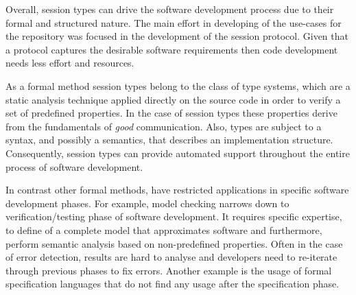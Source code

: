 Overall, session types can drive the software development
process due to their formal and structured nature.
The main effort in developing of the use-cases for the repository
was focused in the development of the session protocol.
Given that a protocol captures the desirable software requirements
then code development needs less effort and resources.
 
As a formal method session types belong to the class of type systems,
which are a static analysis technique applied directly
on the source code in order to verify a set of predefined properties.
In the case of session types these properties derive
from the fundamentals of {\em good} communication.
Also, types are subject to a syntax,
and possibly a semantics, that describes an implementation structure.
Consequently, session types can provide automated support throughout
the entire process of software development. 







In contrast other formal methods, have restricted applications
in specific software development phases.
For example, model checking
narrows down to verification/testing phase of software development.
It requires specific expertise, to define
of a complete model that approximates software and furthermore,
perform semantic analysis based on non-predefined properties.
Often in the case of error detection, results are hard to analyse
and developers need to re-iterate through previous phases
to fix errors.
Another example is the usage of formal specification languages
that do not find any usage after the specification phase.


